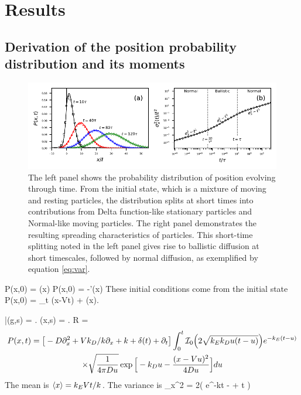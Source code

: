 \section{Results \label{sec:res}}
\subsection{Derivation of the position probability distribution and its moments}
\begin{figure}
	\centerline{\includegraphics{figures/ch2/figure2_slopeKey.pdf}}
	\caption{The left panel shows the probability distribution of position evolving through time. From the initial state, which is a mixture of moving and resting particles, the distribution splits at short times into contributions from Delta function-like stationary particles and Normal-like moving particles. The right panel demonstrates the resulting spreading characteristics of particles. This short-time splitting noted in the left panel gives rise to ballistic diffusion at short timescales, followed by normal diffusion, as exemplified by equation \ref{eq:var}.}
	\label{fig:fig1}
\end{figure}
\be P(x,0) = \delta(x) \ee
\be \pt P(x,0) = -\delta'(x) \ee
These initial conditions come from the initial state
\be P(x,0) = \lim_{t }  \delta(x-Vt) + \delta(x).\ee

\be \bar{}(g,s) = . \ee
\be {}(x,s) = \exp{}. \label{eq:laplace}\ee
\be R = \ee
\begin{multline} P(x,t) = \big[-D\partial_x^2 + Vk_D/k \partial_x + k + \delta(t)+ \partial_t \big]\int_0^t \mathcal{I}_0\Big( 2 \sqrt{k_Ek_D u(t-u)}\Big) e^{-k_E(t-u)} \\ \times \sqrt{ \frac{1}{4\pi D u}} \exp\Big[-k_D u - \frac{(x-Vu)^2}{4Du}\Big] du \end{multline}
The mean is $ \langle x \rangle = k_E V t/k$.
The variance is 
\be \sigma_x^2 = 2\Big( e^{-kt} -  + t \Big) \label{eq:var}\ee
